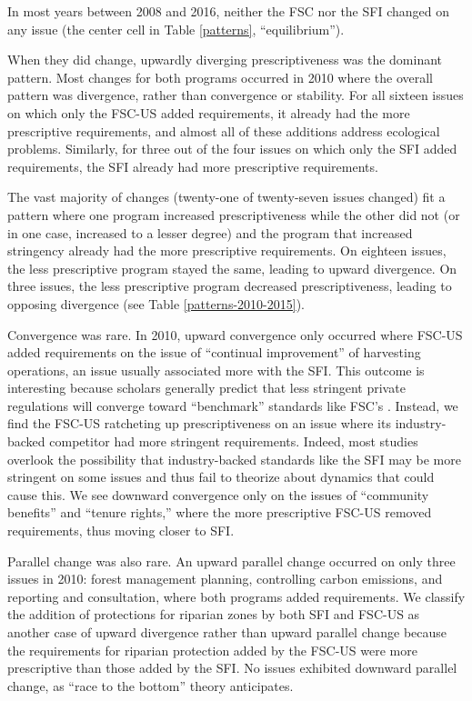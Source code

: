 \documentclass[
      12pt,
            Review ]{article}
\begin{document}
In most years between 2008 and 2016, neither the FSC nor the SFI changed
on any issue (the center cell in Table \ref{patterns}, ``equilibrium'').

When they did change, upwardly diverging prescriptiveness was the
dominant pattern. Most changes for both programs occurred in 2010 where
the overall pattern was divergence, rather than convergence or
stability. For all sixteen issues on which only the FSC-US added
requirements, it already had the more prescriptive requirements, and
almost all of these additions address ecological problems. Similarly,
for three out of the four issues on which only the SFI added
requirements, the SFI already had more prescriptive requirements.

The vast majority of changes (twenty-one of twenty-seven issues changed)
fit a pattern where one program increased prescriptiveness while the
other did not (or in one case, increased to a lesser degree) and the
program that increased stringency already had the more prescriptive
requirements. On eighteen issues, the less prescriptive program stayed
the same, leading to upward divergence. On three issues, the less
prescriptive program decreased prescriptiveness, leading to opposing
divergence (see Table \ref{patterns-2010-2015}).



Convergence was rare. In 2010, upward convergence only occurred where
FSC-US added requirements on the issue of ``continual improvement'' of
harvesting operations, an issue usually associated more with the SFI.
This outcome is interesting because scholars generally predict that less
stringent private regulations will converge toward ``benchmark''
standards like FSC's \citep{Overdevest2005, Overdevest2010}. Instead, we
find the FSC-US ratcheting up prescriptiveness on an issue where its
industry-backed competitor had more stringent requirements. Indeed, most
studies overlook the possibility that industry-backed standards like the
SFI may be more stringent on some issues and thus fail to theorize about
dynamics that could cause this. We see downward convergence only on the
issues of ``community benefits'' and ``tenure rights,'' where the more
prescriptive FSC-US removed requirements, thus moving closer to SFI.

Parallel change was also rare. An upward parallel change occurred on
only three issues in 2010: forest management planning, controlling
carbon emissions, and reporting and consultation, where both programs
added requirements. We classify the addition of protections for riparian
zones by both SFI and FSC-US as another case of upward divergence rather
than upward parallel change because the requirements for riparian
protection added by the FSC-US were more prescriptive than those added
by the SFI. No issues exhibited downward parallel change, as ``race to
the bottom'' theory anticipates.
\end{document}
